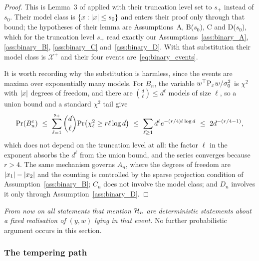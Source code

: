 \documentclass[aos]{imsart}%
\DeclarePairedDelimiter{\abs}{\lvert}{\rvert}
\newcommand{\ambientspace}[0]{\mathcal{X}}
\renewcommand{\Pr}[0]{\textup{Pr}}
\theoremstyle{plain}
\theoremstyle{definition}
\begin{document}
    \begin{proof}
        This is Lemma~3 of \citet{YangWainwrightJordan2016} applied with their
        truncation level set to $s_+$ instead of $s_0$. Their model class is
        $\{x:\abs x\leq s_0\}$ and enters their proof only through that bound;
        the hypotheses of their lemma are Assumptions~A, B($s_0$), C and
        D($s_0$), which for the truncation level $s_+$ read exactly our
        Assumptions~\ref{ass:binary_A}, \ref{ass:binary_B},
        \ref{ass:binary_C} and~\ref{ass:binary_D}. With that substitution their
        model class is $\ambientspace^{+}$ and their four events
        are~\eqref{eq:binary_events}.

        It is worth recording why the substitution is harmless, since the
        events are maxima over exponentially many models. For $B_n$, the
        variable $w^{\top}\mathrm{P}_xw/\sigma_0^{2}$ is $\chi^{2}$ with $\abs x$
        degrees of freedom, and there are $\binom d\ell\leq d^{\ell}$ models of
        size $\ell$, so a union bound and a standard $\chi^{2}$ tail give
        \begin{equation*}
            \Pr(B_n^{c})\ \leq\ \sum_{\ell=1}^{s_+}\binom d\ell
            \Pr\bigl(\chi^{2}_\ell\geq r\ell\log d\bigr)
            \ \leq\ \sum_{\ell\geq1}d^{\ell}e^{-(r/4)\ell\log d}
            \ \leq\ 2d^{-(r/4-1)},
        \end{equation*}
        which does not depend on the truncation level at all: the factor
        $\ell$ in the exponent absorbs the $d^{\ell}$ from the union bound, and
        the series converges because $r>4$. The same mechanism governs $A_n$,
        where the degrees of freedom are $\abs{x_1}-\abs{x_2}$ and the
        counting is controlled by the sparse projection condition of
        Assumption~\ref{ass:binary_B}; $C_n$ does not involve the model class;
        and $D_n$ involves it only through Assumption~\ref{ass:binary_D}.
    \end{proof}

    \emph{From now on all statements that mention $\mathcal{H}_n$ are deterministic
    statements about a fixed realisation of $(y,w)$ lying in that event.} No
    further probabilistic argument occurs in this section.


    \subsubsection{The tempering path}
    \label{sub:binary_path}
\end{document}
